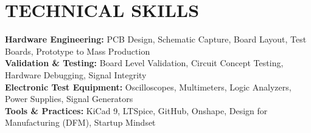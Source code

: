 \documentclass[letterpaper,11pt]{article}
\begin{document}
\section{TECHNICAL SKILLS}
 \begin{itemize}[leftmargin=0.15in, label={}]
    \small{\item{
     \textbf{Hardware Engineering:} PCB Design, Schematic Capture, Board Layout, Test Boards, Prototype to Mass Production \\
     \textbf{Validation \& Testing:} Board Level Validation, Circuit Concept Testing, Hardware Debugging, Signal Integrity \\
     \textbf{Electronic Test Equipment:} Oscilloscopes, Multimeters, Logic Analyzers, Power Supplies, Signal Generators \\
     \textbf{Tools \& Practices:} KiCad 9, LTSpice, GitHub, Onshape, Design for Manufacturing (DFM), Startup Mindset
    }}
 \end{itemize}


\end{document}

